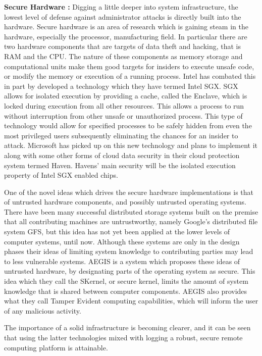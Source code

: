 \textbf{Secure Hardware :} Digging a little deeper into system infrastructure, the lowest level of defense against administrator attacks is directly built into the hardware. Secure hardware is an area of research which is gaining steam in the hardware, especially the processor, manufacturing field. In particular there are two hardware components that are targets of data theft and hacking, that is RAM and the CPU. The nature of these components as memory storage and computational units make them good targets for insiders to execute unsafe code, or modify the memory or execution of a running process. Intel has combated this in part by developed a technology which they have termed Intel SGX.\cite{baumann} SGX allows for isolated execution by providing a cache, called the Enclave, which is locked during execution from all other resources. This allows a process to run without interruption from other unsafe or unauthorized process. This type of technology would allow for specified processes to be safely hidden from even the most privileged users subsequently eliminating the chances for an insider to attack. Microsoft has picked up on this new technology and plans to implement it along with some other forms of cloud data security in their cloud protection system termed Haven. Havens' main security will be the isolated execution property of Intel SGX enabled chips.\cite{baumann}

One of the novel ideas which drives the secure hardware implementations is that of untrusted hardware components, and possibly untrusted operating systems.\cite{suh} There have been many successful distributed storage systems built on the premise that all contributing machines are untrustworthy, namely Google's distributed file system GFS, but this idea has not yet been applied at the lower levels of computer systems, until now. Although these systems are only in the design phases their ideas of limiting system knowledge to contributing parties may lead to less vulnerable systems. AEGIS is a system which proposes these ideas of untrusted hardware, by designating parts of the operating system as secure. This idea which they call the SKernel, or secure kernel, limits the amount of system knowledge that is shared between computer components.\cite{suh} AEGIS also provides what they call Tamper Evident computing capabilities, which will inform the user of any malicious activity.

The importance of a solid infrastructure is becoming clearer, and it can be seen that using the latter technologies mixed with logging a robust, secure remote computing platform is attainable.

